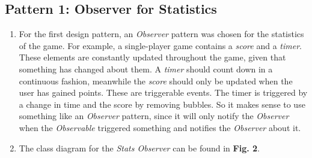 \documentclass[a4paper,11pt]{article}
\begin{document}
\subsection{Pattern 1: Observer for Statistics}
\begin{enumerate}
\item For the first design pattern, an \textit{Observer} pattern was chosen for the statistics of the game. For example, a single-player game contains a \textit{score} and a \textit{timer}. These elements are constantly updated throughout the game, given that something has changed about them. A \textit{timer} should count down in a continuous fashion, meanwhile the \textit{score} should only be updated when the user has gained points. These are triggerable events.
The timer is triggered by a change in time and the score by removing bubbles. So it makes sense to use something like an \textit{Observer} pattern, since it will only notify the \textit{Observer} when the \textit{Observable} triggered something and notifies the \textit{Observer} about it.

\item The class diagram for the \textit{Stats Observer} can be found in \textbf{Fig. 2}.
\begin{minipage}{\linewidth}
\end{minipage}


\end{enumerate}
\end{document}
